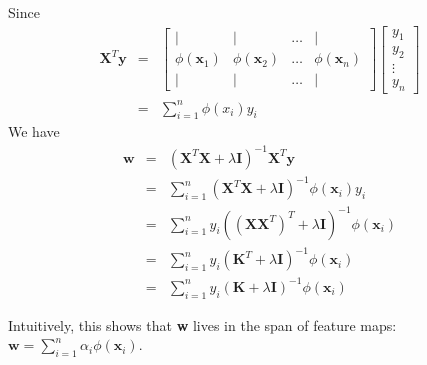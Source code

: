 \documentclass[12pt]{article}
\begin{document}
Since
\begin{eqnarray*}
  \textbf{X}^T \textbf{y} &=&
  \begin{bmatrix}
    | & | & \dots  & | \\
    \phi(\textbf{x}_1) & \phi(\textbf{x}_2) & \dots & \phi(\textbf{x}_n) \\
    | & | & \dots  & |
  \end{bmatrix}
  \begin{bmatrix}
    y_1 \\
    y_2 \\
    \vdots \\
    y_n
  \end{bmatrix} \\
  &=& \sum_{i=1}^n \phi(x_i) y_i
\end{eqnarray*}
We have
\begin{eqnarray*}
  \textbf{w}
  &=& \left( \textbf{X}^T \textbf{X} + \lambda \textbf{I} \right)^{-1}
  \textbf{X}^T \textbf{y} \\
  &=& \sum_{i=1}^n
  \left( \textbf{X}^T \textbf{X} + \lambda \textbf{I} \right)^{-1}
  \phi(\textbf{x}_i) y_i \\
  &=& \sum_{i=1}^n y_i
  \left( \left( \textbf{X} \textbf{X}^T \right)^T 
  + \lambda \textbf{I} \right)^{-1} \phi(\textbf{x}_i) \\
  &=& \sum_{i=1}^n y_i 
  \left( \textbf{K}^T + \lambda \textbf{I} \right)^{-1} \phi(\textbf{x}_i) \\ 
  &=& \sum_{i=1}^n y_i 
  \left( \textbf{K} + \lambda \textbf{I} \right)^{-1} \phi(\textbf{x}_i)
\end{eqnarray*}

Intuitively, this shows that \textbf{w} lives in the span of feature maps: $\textbf{w} = \sum_{i=1}^n \alpha_i \phi(\textbf{x}_i)$. \\
\end{document}
